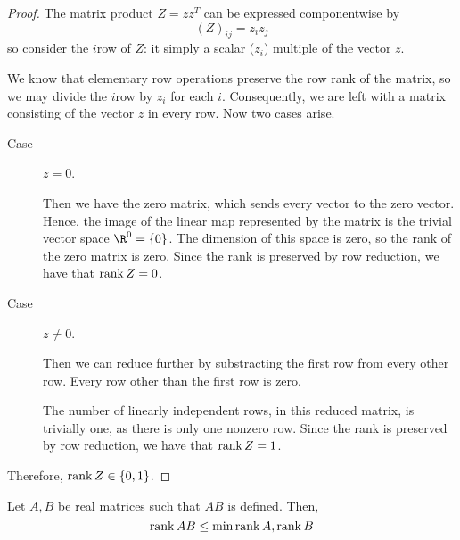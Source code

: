 \documentclass[11pt,letterpaper]{article}
\begin{document}
\begin{proof}
    The matrix product $Z = z z^T$ can be expressed componentwise by
    \begin{equation*}
        (Z)_{ij} = z_i z_j
    \end{equation*}
    so consider the $i$\th row of $Z$: it simply a scalar ($z_i$) multiple of
    the vector $z$.

    We know that elementary row operations preserve the row rank of the matrix,
    so we may divide the $i$\th row by $z_i$ for each $i$.
    Consequently, we are left with a matrix consisting of the vector $z$ in
    every row. Now two cases arise.
    \begin{description}
        \item[Case] $z = 0$.

            Then we have the zero matrix, which sends every vector to the zero
            vector. Hence, the image of the linear map represented by the
            matrix is the trivial vector space $\R^0 = \{0\}$. The dimension of
            this space is zero, so the rank of the zero matrix is zero.
            Since the rank is preserved by row reduction, we have that
            $\operatorname{rank}{Z} = 0$.

        \item[Case] $z \neq 0$.

            Then we can reduce further by substracting the first row from every
            other row. Every row other than the first row is zero.

            The number of linearly independent rows, in this reduced matrix, is
            trivially one, as there is only one nonzero row.
            Since the rank is preserved by row reduction, we have that
            $\operatorname{rank}{Z} = 1$.
    \end{description}
    Therefore, $\operatorname{rank}{Z} \in \{0, 1\}$.
\end{proof}

\begin{prop}
    Let $A, B$ be real matrices such that $AB$ is defined.
    Then,
    \begin{equation*}
        \operatorname{rank}{AB} \leq \min{\operatorname{rank}{A}, \operatorname{rank}{B}}
    \end{equation*}
\end{prop}
\end{document}
